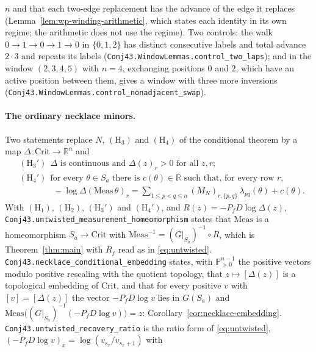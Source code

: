 \documentclass[11pt]{article}
\theoremstyle{definition}
\newcommand{\R}{\mathbb{R}}
\begin{document}
$n$ and that each two-edge replacement has the advance of the edge it replaces (Lemma~\ref{lem:wp-winding-arithmetic},
which states each identity in its own regime; the arithmetic does not use the regime). Two controls: the walk
$0\to1\to0\to1\to0$ in $\{0,1,2\}$ has distinct consecutive labels and total advance $2\cdot3$ and repeats its labels
(\texttt{Conj43.\allowbreak WindowLemmas.\allowbreak control\_\allowbreak two\_\allowbreak laps}); and in the window $(2,3,4,5)$ with $n=4$, exchanging positions $0$ and $2$, which have an
active position between them, gives a window with three more inversions (\texttt{Conj43.\allowbreak WindowLemmas.\allowbreak control\_\allowbreak nonadjacent\_\allowbreak swap}).

\paragraph{The ordinary necklace minors.}
Two statements replace $N$, $(\mathrm H_3)$ and $(\mathrm H_4)$ of the conditional theorem by a map
$\Delta\colon\mathrm{Crit}\to\R^n$ and
\begin{align*}
 &(\mathrm H_3')\ \ \Delta\text{ is continuous and }\Delta(z)_r>0\text{ for all }z,r;\\
 &(\mathrm H_4')\ \ \text{for every }\theta\in S_a\text{ there is }c(\theta)\in\R\text{ such that, for every row }r,\\
 &\qquad\qquad -\log\Delta(\mathrm{Meas}\,\theta)_r=\sum_{1\le p<q\le n}(M_N)_{r,\{p,q\}}\,\lambda_{pq}(\theta)+c(\theta).
\end{align*}
With $(\mathrm H_1)$, $(\mathrm H_2)$, $(\mathrm H_3')$ and $(\mathrm H_4')$, and $R(z)=-P_fD\log\Delta(z)$,
\texttt{Conj43.\allowbreak untwisted\_\allowbreak measurement\_\allowbreak homeomorphism} states that $\mathrm{Meas}$ is a homeomorphism $S_a\to\mathrm{Crit}$ with
$\mathrm{Meas}^{-1}=(G|_{S_a})^{-1}\circ R$, which is Theorem~\ref{thm:main} with $R_f$ read as in
\eqref{eq:untwisted}. \texttt{Conj43.\allowbreak necklace\_\allowbreak conditional\_\allowbreak embedding} states, with $\mathbb P^{n-1}_{>0}$ the positive vectors modulo positive rescaling
with the quotient topology, that $z\mapsto[\Delta(z)]$ is a topological embedding of $\mathrm{Crit}$, and that for
every positive $v$ with $[v]=[\Delta(z)]$ the vector $-P_fD\log v$ lies in $G(S_a)$ and
$\mathrm{Meas}\bigl((G|_{S_a})^{-1}(-P_fD\log v)\bigr)=z$: Corollary~\ref{cor:necklace-embedding}.
\texttt{Conj43.\allowbreak untwisted\_\allowbreak recovery\_\allowbreak ratio} is the ratio form of \eqref{eq:untwisted}, $(-P_fD\log v)_x=\log(v_{s_x}/v_{s_x+1})$ with
\end{document}
